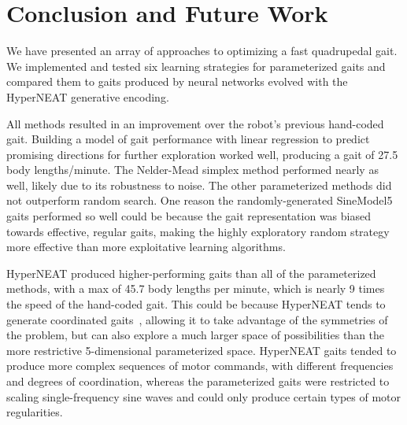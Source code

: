 \section{Conclusion and Future Work}

We have presented an array of approaches to optimizing a fast quadrupedal
gait.  We implemented and tested six learning
strategies for parameterized gaits and compared them to gaits produced by neural networks
evolved with the HyperNEAT generative encoding.

All methods resulted in an improvement over the robot's previous
hand-coded gait.  Building a model of gait
performance with linear regression to predict promising directions for further exploration
worked well, producing a gait of 27.5 body
lengths/minute.  The Nelder-Mead simplex method performed nearly as well, likely due to its robustness to noise.  The other parameterized
methods did not outperform random search.  One reason the randomly-generated SineModel5 gaits performed so well could be because the gait representation was biased towards effective, regular gaits, making the highly exploratory random strategy more effective than more exploitative learning algorithms. 

HyperNEAT produced higher-performing gaits than all of the parameterized
methods, with a max of 45.7 body lengths per minute, which is nearly 9 times the speed of the hand-coded gait.  This could be because HyperNEAT tends to generate coordinated gaits~\cite{clune2011performance, clune2009evolving}, allowing it to
take advantage of the symmetries of the problem, but can also explore a much larger space of possibilities than the
more restrictive 5-dimensional parameterized space.  HyperNEAT gaits tended to produce more complex sequences of motor commands, with different frequencies and degrees of coordination, whereas the
parameterized gaits were restricted to scaling single-frequency sine waves and could only produce certain types of motor regularities. 
